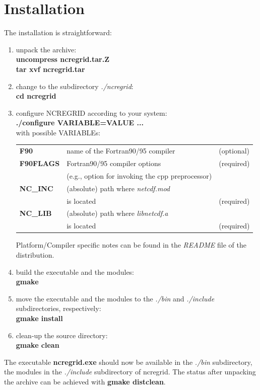 \documentclass[12pt, a4paper]{article}
\begin{document}
\section{Installation}
\label{sec:installation}
The installation is straightforward:
\begin{enumerate}
\item unpack the archive:\\
      {\bf uncompress ncregrid.tar.Z}\\
      {\bf tar xvf ncregrid.tar}\\
\item change to the subdirectory {\it ./ncregrid}:\\
      {\bf cd ncregrid}
\item configure NCREGRID according to your system:\\
      {\bf ./configure VARIABLE=VALUE ...}\\
      with possible VARIABLEs:\\
      \begin{tabular}{lll}
        {\bf F90}      & name of the Fortran90/95 compiler    & (optional)\\
        {\bf F90FLAGS} & Fortran90/95 compiler options        & (required)\\
                       & (e.g., option for invoking the cpp preprocessor) & \\
        {\bf NC\_INC}  & (absolute) path where {\it netcdf.mod} &\\
                       & is located                          & (required)\\
        {\bf NC\_LIB}  & (absolute) path where {\it libnetcdf.a} &\\
                       & is located                          & (required)\\
      \end{tabular}
      Platform/Compiler specific notes can be found in the {\it README} file
      of the distribution.
\item build the executable and the modules:\\
      {\bf gmake}
\item move the executable and the modules to the {\it ./bin} and
      {\it ./include}
      subdirectories, respectively:\\
      {\bf gmake install}
\item clean-up the source directory:\\
      {\bf gmake clean}
\end{enumerate}
%
The executable {\bf ncregrid.exe} should now be available in the
{\it ./bin} subdirectory, the modules in the {\it ./include}
subdirectory of ncregrid.
The status after unpacking the archive can be achieved
with {\bf gmake distclean}.
\end{document}
